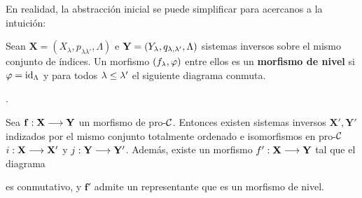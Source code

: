 En realidad, la abstracción inicial se puede simplificar para acercanos a la intuición:
\begin{definition}
  Sean $ \mathbf{X} = (X_{\lambda},p_{\lambda\lambda'}, \Lambda) $ e $ \mathbf{Y } = (Y_\lambda , q_{\lambda,\lambda'},\Lambda ) $ sistemas inversos sobre el mismo conjunto de índices. Un morfismo $ (f_\lambda,\varphi) $ entre ellos es un \textbf{morfismo de nivel} si $ \varphi = \operatorname{id}_{\Lambda } $ y para todos $ \lambda\leq \lambda' $ el siguiente diagrama conmuta.
  \begin{center}
    .
  \end{center}
\end{definition}
\begin{theorem}[]
  Sea $ \mathbf{f }:\mathbf{X}\longrightarrow \mathbf{Y } $ un morfismo de pro-$ \mathcal{C}  $. Entonces existen sistemas inversos $ \mathbf{X}',\mathbf{Y }' $ indizados por el mismo conjunto totalmente ordenado e isomorfismos en pro-$ \mathcal{C}  $ $ i:\mathbf{X}\longrightarrow \mathbf{X}'  $ y $ j:\mathbf{Y }\longrightarrow \mathbf{Y}' $. Además, existe un morfismo $ f':\mathbf{X}\longrightarrow \mathbf{Y } $ tal que el diagrama 
  \begin{center}
  \end{center}
  es conmutativo, y $ \mathbf{f' } $ admite un representante que es un morfismo de nivel.
\end{theorem}



